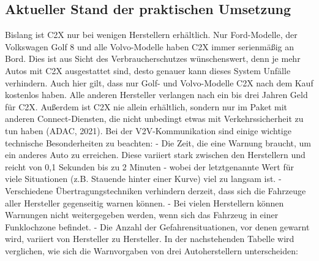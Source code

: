 \documentclass[
]{book}
\begin{document}
\hypertarget{aktueller-stand-der-praktischen-umsetzung-18}{%
\subsection*{Aktueller Stand der praktischen Umsetzung}\label{aktueller-stand-der-praktischen-umsetzung-18}}

Bislang ist C2X nur bei wenigen Herstellern erhältlich. Nur Ford-Modelle, der Volkswagen Golf 8 und alle Volvo-Modelle haben C2X immer serienmäßig an Bord. Dies ist aus Sicht des Verbraucherschutzes wünschenswert, denn je mehr Autos mit C2X ausgestattet sind, desto genauer kann dieses System Unfälle verhindern. Auch hier gilt, dass nur Golf- und Volvo-Modelle C2X nach dem Kauf kostenlos haben. Alle anderen Hersteller verlangen nach ein bis drei Jahren Geld für C2X. Außerdem ist C2X nie allein erhältlich, sondern nur im Paket mit anderen Connect-Diensten, die nicht unbedingt etwas mit Verkehrssicherheit zu tun haben (ADAC, 2021).
Bei der V2V-Kommunikation sind einige wichtige technische Besonderheiten zu beachten:
- Die Zeit, die eine Warnung braucht, um ein anderes Auto zu erreichen. Diese variiert stark zwischen den Herstellern und reicht von 0,1 Sekunden bis zu 2 Minuten - wobei der letztgenannte Wert für viele Situationen (z.B. Stauende hinter einer Kurve) viel zu langsam ist.
- Verschiedene Übertragungstechniken verhindern derzeit, dass sich die Fahrzeuge aller Hersteller gegenseitig warnen können.
- Bei vielen Herstellern können Warnungen nicht weitergegeben werden, wenn sich das Fahrzeug in einer Funklochzone befindet.
- Die Anzahl der Gefahrensituationen, vor denen gewarnt wird, variiert von Hersteller zu Hersteller.
In der nachstehenden Tabelle wird verglichen, wie sich die Warnvorgaben von drei Autoherstellern unterscheiden:
\end{document}
